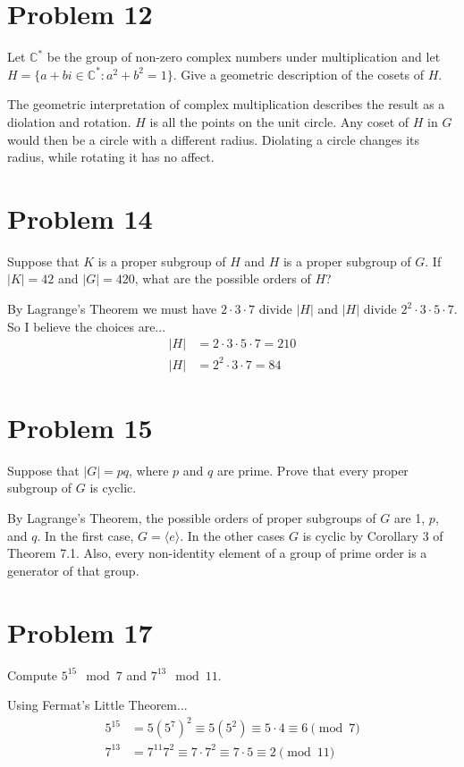 \documentclass{article}
\begin{document}
\section*{Problem 12}

Let $\mathbb{C}^{*}$ be the group of non-zero complex numbers under multiplication
and let $H=\{a+bi\in\mathbb{C}^{*}:a^2+b^2=1\}$.  Give a geometric description
of the cosets of $H$.

The geometric interpretation of complex multiplication describes the result as
a diolation and rotation.  $H$ is all the points on the unit circle.  Any coset
of $H$ in $G$ would then be a circle with a different radius.  Diolating a circle
changes its radius, while rotating it has no affect.

\section*{Problem 14}

Suppose that $K$ is a proper subgroup of $H$ and $H$ is a proper subgroup of
$G$.  If $|K|=42$ and $|G|=420$, what are the possible orders of $H$?

By Lagrange's Theorem we must have $2\cdot 3\cdot 7$ divide $|H|$
and $|H|$ divide $2^2\cdot 3\cdot 5\cdot 7$.
So I believe the choices are...
\begin{align*}
|H|&=2\cdot 3\cdot 5\cdot 7 = 210 \\
|H|&=2^2\cdot 3\cdot 7 = 84
\end{align*}

\section*{Problem 15}

Suppose that $|G|=pq$, where $p$ and $q$ are prime.  Prove that
every proper subgroup of $G$ is cyclic.

By Lagrange's Theorem, the possible orders of proper subgroups of $G$ are 1, $p$, and $q$.
In the first case, $G=\langle e\rangle$.  In the other cases $G$
is cyclic by Corollary 3 of Theorem 7.1.  Also, every non-identity element of
a group of prime order is a generator of that group.

\section*{Problem 17}

Compute $5^{15}\mod 7$ and $7^{13}\mod 11$.

Using Fermat's Little Theorem...
\begin{align*}
5^{15}&=5(5^7)^2\equiv 5(5^2)\equiv 5\cdot 4\equiv 6\pmod{7} \\
7^{13}&=7^{11}7^2\equiv 7\cdot 7^2\equiv 7\cdot 5\equiv 2\pmod{11}
\end{align*}
\end{document}
